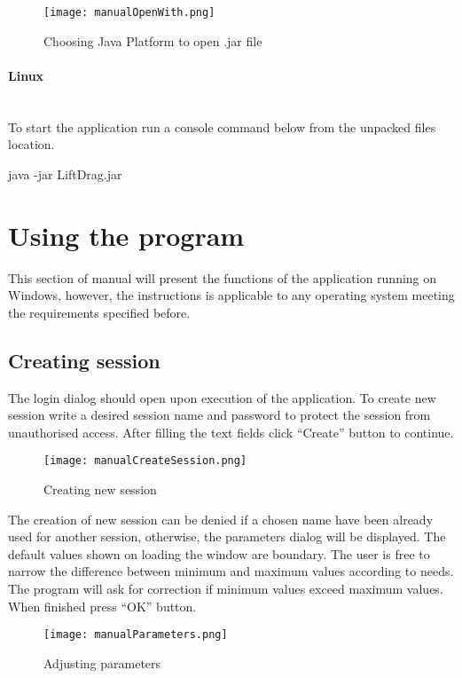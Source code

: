 \documentclass[a4paper,12pt]{article}
\begin{document}
\begin{figure}[h!]
	\centering
\texttt{[image: manualOpenWith.png]}\\
\caption{Choosing Java Platform to open .jar file}
\end{figure}

\paragraph{Linux}\mbox{}\\
To start the application run a console command below from the unpacked files location.
\newline

java -jar LiftDrag.jar

\section{Using the program}
This section of manual will present the functions of the application running on Windows, however, the instructions is applicable to any operating system meeting the requirements specified before.

\subsection{Creating session}
The login dialog should open upon execution of the application. To create new session write a desired session name and password to protect the session from unauthorised access. After filling the text fields click ``Create'' button to continue.

\begin{figure}[h!]
	\centering
\texttt{[image: manualCreateSession.png]}\\
\caption{Creating new session}
\end{figure}

The creation of new session can be denied if a chosen name have been already used for another session, otherwise, the parameters dialog will be displayed.
The default values shown on loading the window are boundary. The user is free to narrow the difference between minimum and maximum values according to needs. The program will ask for correction if minimum values exceed maximum values.
When finished press ``OK'' button.
	
\begin{figure}[h!]
\centering
\texttt{[image: manualParameters.png]}\\
\caption{Adjusting parameters}
\end{figure}
\end{document}
